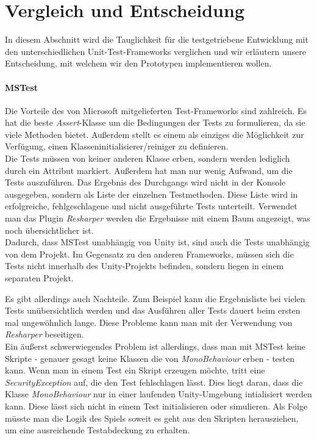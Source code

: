 \section{Vergleich und Entscheidung}\label{sec:Vergleich_und_Entscheidung}

In diesem Abschnitt wird die Tauglichkeit für die testgetriebene Entwicklung mit den unterschiedlichen Unit-Test-Frameworks verglichen und wir erläutern unsere Entscheidung, mit welchem wir den Prototypen implementieren wollen.

\paragraph{MSTest} Die Vorteile des von Microsoft mitgelieferten Test-Frameworks sind zahlreich. Es hat die beste \textit{Assert}-Klasse um die Bedingungen der Tests zu formulieren, da sie viele Methoden bietet. Außerdem stellt es einem als einziges die Möglichkeit zur Verfügung, einen Klasseninitialisierer/reiniger zu definieren.\\
Die Tests müssen von keiner anderen Klasse erben, sondern werden lediglich durch ein Attribut markiert. Außerdem hat man nur wenig Aufwand, um die Tests auszuführen. Das Ergebnis des Durchgangs wird nicht in der Konsole ausgegeben, sondern als Liste der einzelnen Testmethoden. Diese Liste wird in erfolgreiche, fehlgeschlagene und nicht ausgeführte Tests unterteilt. Verwendet man das Plugin \textit{Resharper} werden die Ergebnisse mit einem Baum angezeigt, was noch übersichtlicher ist.\\
Dadurch, dass MSTest unabhängig von Unity ist, sind auch die Tests unabhängig von dem Projekt. Im Gegensatz zu den anderen Frameworks, müssen sich die Tests nicht innerhalb des Unity-Projekts befinden, sondern liegen in einem separaten Projekt.

Es gibt allerdings auch Nachteile. Zum Beispiel kann die Ergebnisliste bei vielen Tests unübersichtlich werden und das Ausführen aller Tests dauert beim ersten mal ungewöhnlich lange. Diese Probleme kann man mit der Verwendung von \textit{Resharper} beseitigen.\\
Ein äußerst schwerwiegendes Problem ist allerdings, dass man mit MSTest keine Skripte - genauer gesagt keine Klassen die von \textit{MonoBehaviour} erben - testen kann. Wenn man in einem Test ein Skript erzeugen möchte, tritt eine \textit{SecurityException} auf, die den Test fehlschlagen lässt. Dies liegt daran, dass die Klasse \textit{MonoBehaviour} nur in einer laufenden Unity-Umgebung intialisiert werden kann. Diese lässt sich nicht in einem Test initialisieren oder simulieren. Als Folge müsste man die Logik des Spiels soweit es geht aus den Skripten herausziehen, um eine ausreichende Testabdeckung zu erhalten.

